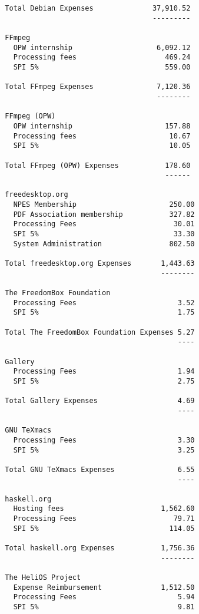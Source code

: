 \documentclass[letterpaper]{report}
\begin{document}
\begin{verbatim}
  Total Debian Expenses              37,910.52
                                     ---------

  FFmpeg
    OPW internship                    6,092.12
    Processing fees                     469.24
    SPI 5%                              559.00

  Total FFmpeg Expenses               7,120.36
                                      --------

  FFmpeg (OPW)
    OPW internship                      157.88
    Processing fees                      10.67
    SPI 5%                               10.05

  Total FFmpeg (OPW) Expenses           178.60
                                        ------

  freedesktop.org
    NPES Membership                      250.00
    PDF Association membership           327.82
    Processing Fees                       30.01
    SPI 5%                                33.30
    System Administration                802.50

  Total freedesktop.org Expenses       1,443.63
                                       --------

  The FreedomBox Foundation
    Processing Fees                        3.52
    SPI 5%                                 1.75

  Total The FreedomBox Foundation Expenses 5.27
                                           ----

  Gallery
    Processing Fees                        1.94
    SPI 5%                                 2.75

  Total Gallery Expenses                   4.69
                                           ----

  GNU TeXmacs
    Processing Fees                        3.30
    SPI 5%                                 3.25

  Total GNU TeXmacs Expenses               6.55
                                           ----

  haskell.org
    Hosting fees                       1,562.60
    Processing Fees                       79.71
    SPI 5%                               114.05

  Total haskell.org Expenses           1,756.36
                                       --------

  The HeliOS Project
    Expense Reimbursement              1,512.50
    Processing Fees                        5.94
    SPI 5%                                 9.81


\end{verbatim}
\end{document}
